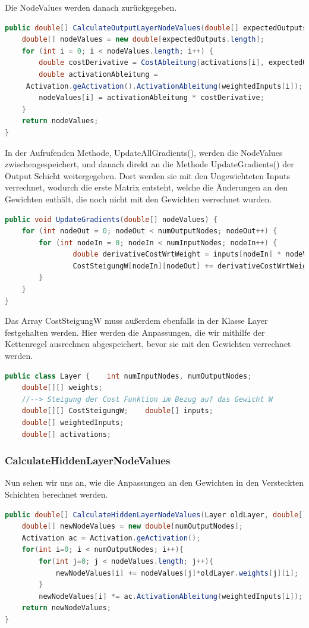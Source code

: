 \documentclass[12pt]{article}
\begin{document}
Die NodeValues werden danach zurückgegeben.\begin{lstlisting}[language=Java]
public double[] CalculateOutputLayerNodeValues(double[] expectedOutputs) {
    double[] nodeValues = new double[expectedOutputs.length];
    for (int i = 0; i < nodeValues.length; i++) {
        double costDerivative = CostAbleitung(activations[i], expectedOutputs[i]);
        double activationAbleitung = 
     Activation.geActivation().ActivationAbleitung(weightedInputs[i]);
        nodeValues[i] = activationAbleitung * costDerivative;
    }
    return nodeValues;
}
\end{lstlisting}In der Aufrufenden Methode, UpdateAllGradients(), werden die NodeValues zwischengespeichert, und danach direkt an die Methode UpdateGradients() der Output Schicht weitergegeben. Dort werden sie mit den Ungewichteten Inputs verrechnet, wodurch die erste Matrix entsteht, welche die Änderungen an den Gewichten enthält, die noch nicht mit den Gewichten verrechnet wurden.\begin{lstlisting}[language=Java]
public void UpdateGradients(double[] nodeValues) {
    for (int nodeOut = 0; nodeOut < numOutputNodes; nodeOut++) {
        for (int nodeIn = 0; nodeIn < numInputNodes; nodeIn++) {
	            double derivativeCostWrtWeight = inputs[nodeIn] * nodeValues[nodeOut];
	            CostSteigungW[nodeIn][nodeOut] += derivativeCostWrtWeight;
        }
    }
}
\end{lstlisting}Das Array CostSteigungW muss außerdem ebenfalls in der Klasse Layer festgehalten werden. Hier werden die Anpassungen, die wir mithilfe der Kettenregel ausrechnen abgespeichert, bevor sie mit den Gewichten verrechnet werden.\begin{lstlisting}[language=Java]
public class Layer {    int numInputNodes, numOutputNodes;
    double[][] weights;
    //--> Steigung der Cost Funktion im Bezug auf das Gewicht W
    double[][] CostSteigungW;    double[] inputs;
    double[] weightedInputs;
    double[] activations;
\end{lstlisting}\subsubsection{CalculateHiddenLayerNodeValues}Nun sehen wir uns an, wie die Anpassungen an den Gewichten in den Versteckten Schichten berechnet werden.\begin{lstlisting}[language=Java]
public double[] CalculateHiddenLayerNodeValues(Layer oldLayer, double[] nodeValues) {
    double[] newNodeValues = new double[numOutputNodes];
    Activation ac = Activation.geActivation();
    for(int i=0; i < numOutputNodes; i++){
        for(int j=0; j < nodeValues.length; j++){
            newNodeValues[i] += nodeValues[j]*oldLayer.weights[j][i];
        } 
        newNodeValues[i] *= ac.ActivationAbleitung(weightedInputs[i]);
    return newNodeValues;
}
\end{lstlisting}
\end{document}
